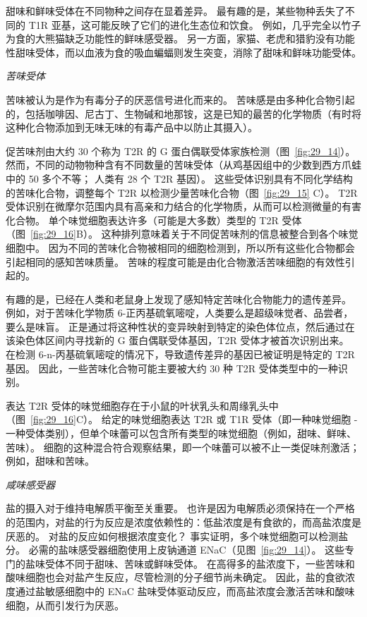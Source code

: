 甜味和鲜味受体在不同物种之间存在显着差异。
最有趣的是，某些物种丢失了不同的 T1R 亚基，这可能反映了它们的进化生态位和饮食。
例如，几乎完全以竹子为食的大熊猫缺乏功能性的鲜味感受器。
另一方面，家猫、老虎和猎豹没有功能性甜味受体，而以血液为食的吸血蝙蝠则发生突变，消除了甜味和鲜味功能受体。



\textit{苦味受体}

苦味被认为是作为有毒分子的厌恶信号进化而来的。
苦味感是由多种化合物引起的，包括咖啡因、尼古丁、生物碱和地那铵，这是已知的最苦的化学物质（有时将这种化合物添加到无味无味的有毒产品中以防止其摄入）。


促苦味剂由大约 30 个称为 T2R 的 G 蛋白偶联受体家族检测（图~\ref{fig:29_14}）。
然而，不同的动物物种含有不同数量的苦味受体（从鸡基因组中的少数到西方爪蛙中的 50 多个不等；
人类有 28 个 T2R 基因）。
这些受体识别具有不同化学结构的苦味化合物，调整每个 T2R 以检测少量苦味化合物（图~\ref{fig:29_15} C）。
T2R 受体识别在微摩尔范围内具有高亲和力结合的化学物质，从而可以检测微量的有害化合物。
单个味觉细胞表达许多（可能是大多数）类型的 T2R 受体（图~\ref{fig:29_16}B）。
这种排列意味着关于不同促苦味剂的信息被整合到各个味觉细胞中。
因为不同的苦味化合物被相同的细胞检测到，所以所有这些化合物都会引起相同的感知苦味质量。
苦味的程度可能是由化合物激活苦味细胞的有效性引起的。


有趣的是，已经在人类和老鼠身上发现了感知特定苦味化合物能力的遗传差异。
例如，对于苦味化学物质 6-正丙基硫氧嘧啶，人类要么是超级味觉者、品尝者，要么是味盲。
正是通过将这种性状的变异映射到特定的染色体位点，然后通过在该染色体区间内寻找新的 G 蛋白偶联受体基因，T2R 受体才被首次识别出来。
在检测 6-n-丙基硫氧嘧啶的情况下，导致遗传差异的基因已被证明是特定的 T2R 基因。
因此，一些苦味化合物可能主要被大约 30 种 T2R 受体类型中的一种识别。


表达 T2R 受体的味觉细胞存在于小鼠的叶状乳头和周缘乳头中（图~\ref{fig:29_16}C）。
给定的味觉细胞表达 T2R 或 T1R 受体（即一种味觉细胞 - 一种受体类别），但单个味蕾可以包含所有类型的味觉细胞（例如，甜味、鲜味、苦味）。
细胞的这种混合符合观察结果，即一个味蕾可以被不止一类促味剂激活； 例如，甜味和苦味。



\textit{咸味感受器}

盐的摄入对于维持电解质平衡至关重要。
也许是因为电解质必须保持在一个严格的范围内，对盐的行为反应是浓度依赖性的：低盐浓度是有食欲的，而高盐浓度是厌恶的。
对盐的反应如何根据浓度变化？
事实证明，多个味觉细胞可以检测盐分。
必需的盐味感受器细胞使用上皮钠通道 ENaC（见图~\ref{fig:29_14}）。
这些专门的盐味受体不同于甜味、苦味或鲜味受体。
在高得多的盐浓度下，一些苦味和酸味细胞也会对盐产生反应，尽管检测的分子细节尚未确定。
因此，盐的食欲浓度通过盐敏感细胞中的 ENaC 盐味受体驱动反应，而高盐浓度会激活苦味和酸味细胞，从而引发行为厌恶。




